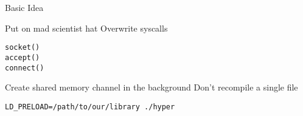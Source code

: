 
\begin{slide}{Basic Idea}
  \begin{enumerate}
    \pitem Put on mad scientist hat
    \pitem Overwrite syscalls\\
           \begin{center}
             \texttt{socket()}\\
             \texttt{accept()}\\
             \texttt{connect()}
           \end{center}
    \pitem Create shared memory channel in the background
    \pitem Don't recompile a single file\\
  \end{enumerate}
  \vspace{0.2cm}

  \texttt{LD\_PRELOAD=/path/to/our/library ./hyper}
\end{slide}
